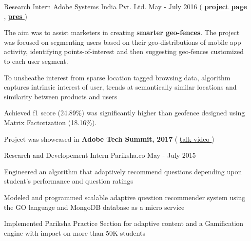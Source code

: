 \begin{cventries}
  \cventry
    {Research Intern} %
    {Adobe Systems India Pvt. Ltd.} %
    {May - July 2016} %
    {
    	(
	    	\textbf{\href{https://research.adobe.com/project/smart-geo-fencing/}{project page} \ExternalLink},
	    	\href{https://drive.google.com/file/d/1nfCv13-7V3BElFPLBfFI\_LF0RRcsdNvy/view?usp=sharing}{\textbf{pres \ExternalLink}}
	    )
    }  %
    {
      \begin{cvitems} %
        \item {
			The aim was to assist marketers in creating \textbf{smarter geo-fences}. The project was focused on segmenting users based on their geo-distributions of mobile app activity, identifying points-of-interest and then suggesting geo-fences customized to each user segment.
        }
        \item { 
        	To unsheathe interest from sparse location tagged browsing data, algorithm captures intrinsic interest of user, trends at semantically similar locations and similarity between products and users
        }
        \item {
        	Achieved f1 score (24.89\%) was significantly higher than geofence designed using Matrix Factorization (18.16\%). 
        }
        \item {
        	 Project was showcased in \textbf{Adobe Tech Summit, 2017} ( \href{https://www.youtube.com/watch?v=PS0imh951ZE}{talk video \ExternalLink}) 
        }
      \end{cvitems}
    }

  \cventry
    {Research and Developement Intern} %
    {Pariksha.co} %
    {May - July 2015} %
    {} %
    {
      \begin{cvitems} 
      	\item {Engineered an algorithm that adaptively recommend questions depending upon student’s performance and question ratings}
      	\item {Modeled and programmed scalable adaptive question recommender system using the GO language and MongoDB database as a micro service}
      	\item {Implemented Pariksha Practice Section for adaptive content and a Gamification engine with impact on more than 50K students}
      \end{cvitems}
    }
\end{cventries}



